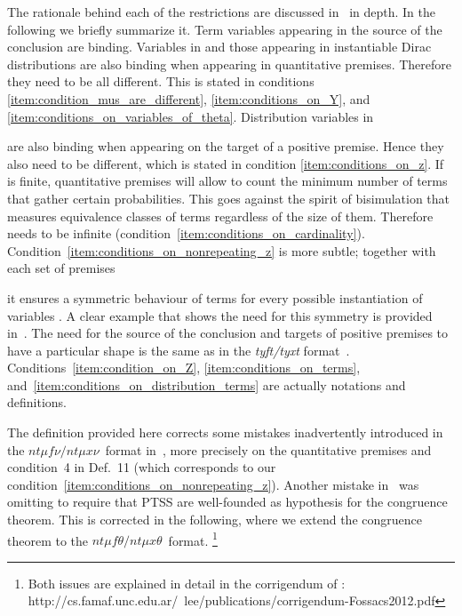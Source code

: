 \documentclass[submission,copyright,creativecommons]{eptcs}
\newcommand{\ntmufnu}{\ensuremath{\textit{nt}\mu\textit{f}\nu}}
\newcommand{\ntmuxnu}{\ensuremath{\textit{nt}\mu\textit{x}\nu}}
\newcommand{\ntmufxnu}{\ensuremath{\ntmufnu\textit{/}\ntmuxnu}}
\newcommand{\ntmuft}{\ensuremath{\textit{nt}\mu\textit{f}\theta}}
\newcommand{\ntmuxt}{\ensuremath{\textit{nt}\mu\textit{x}\theta}}
\newcommand{\ntmufxt}{\ensuremath{\ntmuft\textit{/}\ntmuxt}}
\begin{document}
The rationale behind each of the restrictions are discussed
in~\cite{DL-fossacs12} in depth.
In the following we briefly summarize it.
Term variables  appearing in the source of the
conclusion are binding.  Variables in  and those
appearing in instantiable Dirac distributions are also binding when
appearing in quantitative premises.  Therefore they need to be all
different.  This is stated in conditions
\ref{item:condition_mus_are_different}, \ref{item:conditions_on_Y},
and \ref{item:conditions_on_variables_of_theta}.
Distribution variables in 

are also binding when appearing on the target of a positive
premise. Hence they also need to be different, which is stated in
condition \ref{item:conditions_on_z}.
If  is finite, quantitative premises will allow to count the
minimum number of terms that gather certain probabilities.  This goes
against the spirit of bisimulation that measures equivalence classes of
terms regardless of the size of them.  Therefore  needs to be
infinite (condition~\ref{item:conditions_on_cardinality}).
Condition~\ref{item:conditions_on_nonrepeating_z} is more subtle;
together with each set of premises

it ensures a symmetric behaviour of terms  for every
possible instantiation of variables .  A clear example that
shows the need for this symmetry is provided in~\cite{DL-fossacs12}.
The need for the source of the conclusion and targets of positive
premises to have a particular shape is the same as in the
\emph{tyft/tyxt} format~\cite{GrooteVaandrager92}.
Conditions~\ref{item:condition_on_Z},
\ref{item:conditions_on_terms},
and~\ref{item:conditions_on_distribution_terms} are actually notations
and definitions.





The definition provided here corrects some mistakes inadvertently
introduced in the \ntmufxnu\ format in~\cite{DL-fossacs12}, more
precisely on the quantitative premises and condition~4 in Def.~11
(which corresponds to our
condition~\ref{item:conditions_on_nonrepeating_z}).
Another mistake in~\cite{DL-fossacs12} was omitting to require that
PTSS are well-founded as hypothesis for the congruence theorem.  This
is corrected in the following, where we extend the congruence theorem
to the \ntmufxt\ format.
\footnote{Both issues are explained in detail in the corrigendum of \cite{DL-fossacs12}:
http://cs.famaf.unc.edu.ar/~lee/publications/corrigendum-Fossacs2012.pdf}
\end{document}

